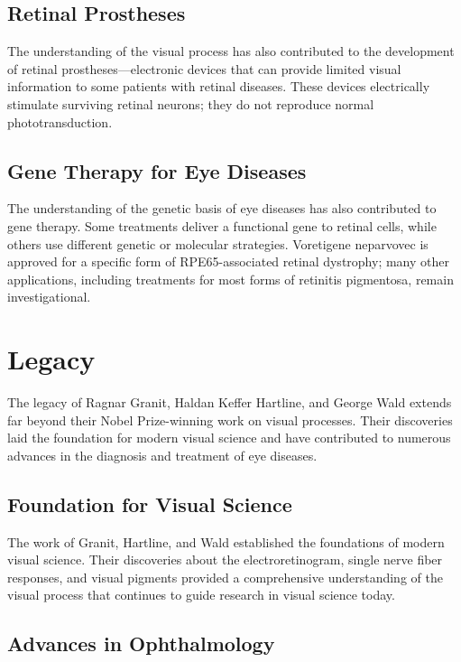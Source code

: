\subsection{Retinal Prostheses}

The understanding of the visual process has also contributed to the development of retinal prostheses---electronic devices that can provide limited visual information to some patients with retinal diseases. These devices electrically stimulate surviving retinal neurons; they do not reproduce normal phototransduction.

\subsection{Gene Therapy for Eye Diseases}

The understanding of the genetic basis of eye diseases has also contributed to gene therapy. Some treatments deliver a functional gene to retinal cells, while others use different genetic or molecular strategies. Voretigene neparvovec is approved for a specific form of RPE65-associated retinal dystrophy; many other applications, including treatments for most forms of retinitis pigmentosa, remain investigational.

\section{Legacy}

The legacy of Ragnar Granit, Haldan Keffer Hartline, and George Wald extends far beyond their Nobel Prize-winning work on visual processes. Their discoveries laid the foundation for modern visual science and have contributed to numerous advances in the diagnosis and treatment of eye diseases.

\subsection{Foundation for Visual Science}

The work of Granit, Hartline, and Wald established the foundations of modern visual science. Their discoveries about the electroretinogram, single nerve fiber responses, and visual pigments provided a comprehensive understanding of the visual process that continues to guide research in visual science today.

\subsection{Advances in Ophthalmology}

